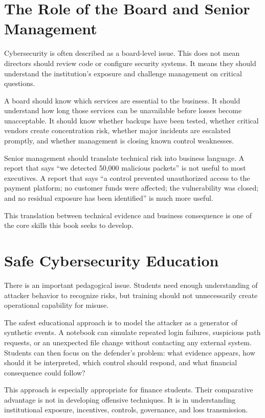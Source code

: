 \section{The Role of the Board and Senior Management}

Cybersecurity is often described as a board-level issue. This does not mean directors should review code or configure security systems. It means they should understand the institution's exposure and challenge management on critical questions.

A board should know which services are essential to the business. It should understand how long those services can be unavailable before losses become unacceptable. It should know whether backups have been tested, whether critical vendors create concentration risk, whether major incidents are escalated promptly, and whether management is closing known control weaknesses.

Senior management should translate technical risk into business language. A report that says ``we detected 50,000 malicious packets'' is not useful to most executives. A report that says ``a control prevented unauthorized access to the payment platform; no customer funds were affected; the vulnerability was closed; and no residual exposure has been identified'' is much more useful.

This translation between technical evidence and business consequence is one of the core skills this book seeks to develop.

\section{Safe Cybersecurity Education}

There is an important pedagogical issue. Students need enough understanding of attacker behavior to recognize risks, but training should not unnecessarily create operational capability for misuse.

The safest educational approach is to model the attacker as a generator of synthetic events. A notebook can simulate repeated login failures, suspicious path requests, or an unexpected file change without contacting any external system. Students can then focus on the defender's problem: what evidence appears, how should it be interpreted, which control should respond, and what financial consequence could follow?

This approach is especially appropriate for finance students. Their comparative advantage is not in developing offensive techniques. It is in understanding institutional exposure, incentives, controls, governance, and loss transmission.

